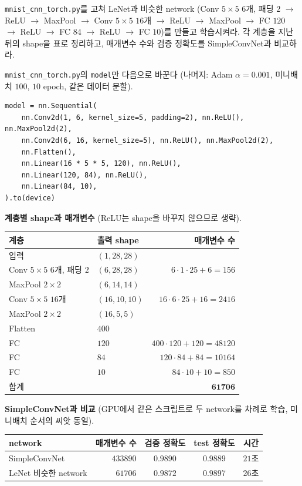 \documentclass[11pt,a4paper]{article}
\begin{document}
\begin{problems}
\item \texttt{mnist\_cnn\_torch.py}를 고쳐 LeNet과 비슷한 network
(Conv $5\times5$ $6$개, 패딩 $2$ $\to$ ReLU $\to$ MaxPool $\to$ Conv $5\times5$ $16$개 $\to$ ReLU $\to$ MaxPool $\to$ FC $120$ $\to$ ReLU $\to$ FC $84$ $\to$ ReLU $\to$ FC $10$)를 만들고 학습시켜라.
각 계층을 지난 뒤의 shape을 표로 정리하고, 매개변수 수와 검증 정확도를 SimpleConvNet과 비교하라.

\begin{sol}
\texttt{mnist\_cnn\_torch.py}의 \texttt{model}만 다음으로 바꾼다 (나머지: Adam $\alpha=0.001$, 미니배치 $100$, $10$ epoch, 같은 데이터 분할).
\begin{lstlisting}[numbers=none]
model = nn.Sequential(
    nn.Conv2d(1, 6, kernel_size=5, padding=2), nn.ReLU(), nn.MaxPool2d(2),
    nn.Conv2d(6, 16, kernel_size=5), nn.ReLU(), nn.MaxPool2d(2),
    nn.Flatten(),
    nn.Linear(16 * 5 * 5, 120), nn.ReLU(),
    nn.Linear(120, 84), nn.ReLU(),
    nn.Linear(84, 10),
).to(device)
\end{lstlisting}

\textbf{계층별 shape과 매개변수} (ReLU는 shape을 바꾸지 않으므로 생략).
\begin{center}
\begin{tabular}{llr}
\toprule
계층 & 출력 shape & 매개변수 수 \\
\midrule
입력 & $(1,28,28)$ & \\
Conv $5\times5$ $6$개, 패딩 $2$ & $(6,28,28)$ & $6\cdot1\cdot25+6=156$ \\
MaxPool $2\times2$ & $(6,14,14)$ & \\
Conv $5\times5$ $16$개 & $(16,10,10)$ & $16\cdot6\cdot25+16=2416$ \\
MaxPool $2\times2$ & $(16,5,5)$ & \\
Flatten & $400$ & \\
FC & $120$ & $400\cdot120+120=48120$ \\
FC & $84$ & $120\cdot84+84=10164$ \\
FC & $10$ & $84\cdot10+10=850$ \\
\midrule
합계 & & $\mathbf{61706}$ \\
\bottomrule
\end{tabular}
\end{center}

\textbf{SimpleConvNet과 비교} (GPU에서 같은 스크립트로 두 network를 차례로 학습, 미니배치 순서의 씨앗 동일).
\begin{center}
\begin{tabular}{lrccc}
\toprule
network & 매개변수 수 & 검증 정확도 & test 정확도 & 시간 \\
\midrule
SimpleConvNet & $433890$ & $\mathbf{0.9890}$ & $0.9889$ & $21$초 \\
LeNet 비슷한 network & $61706$ & $0.9872$ & $0.9897$ & $26$초 \\
\bottomrule
\end{tabular}
\end{center}


\end{sol}
\end{problems}
\end{document}
